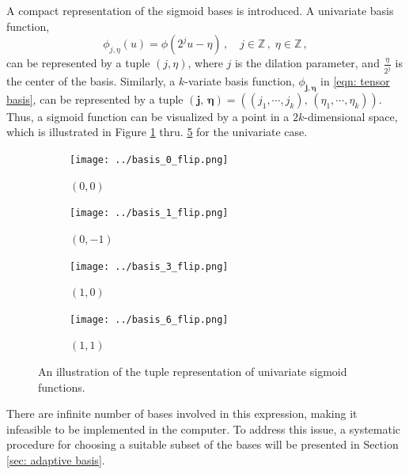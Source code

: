 A compact representation of the sigmoid bases is introduced.
A univariate basis function,
\begin{equation*}
    {\phi}_{j,\eta}(u) = {\phi}(2^j u-\eta) \,,\quad j\in \mathbb{Z} \,,\;\eta \in \mathbb{Z}\,,
    \label{eqn: self similar sigmoid}
\end{equation*}
can be represented by a tuple $(j, \eta)$,
where $j$ is the dilation parameter, and $\frac{\eta}{2^j}$ is
the center of the basis.
Similarly, a $k$-variate basis function, $\phi_{\boldsymbol{j}, \boldsymbol{\eta}}$ in
\eqref{eqn: tensor basis}, can be represented by a tuple $\left(\boldsymbol{j}, \,
\boldsymbol{\eta}\right) 
= \left((j_1,\cdots, j_k), \, \left(\eta_1, \cdots, \eta_k\right)\right)$.
Thus, a sigmoid function can be visualized by a point in a $2k$-dimensional space,
which is illustrated in Figure \ref{fig: basis 0} thru. \ref{fig: basis 3} 
for the univariate case.\\
\begin{figure}[htbp]\begin{center}
    \begin{subfigure}[t]{.48\textwidth}
        \centering
        \texttt{[image: ../basis\_0\_flip.png]}
        \caption{$\left(0,0\right)$}
        \label{fig: basis 0}
    \end{subfigure}
    \begin{subfigure}[t]{.48\textwidth}
        \centering
        \texttt{[image: ../basis\_1\_flip.png]}
        \caption{$\left(0, -1\right)$}
        \label{fig: basis 1}
    \end{subfigure}
    \begin{subfigure}[t]{.48\textwidth}
        \centering
        \texttt{[image: ../basis\_3\_flip.png]}
        \caption{$\left(1, 0\right)$}
        \label{fig: basis 2}
    \end{subfigure}
    \begin{subfigure}[t]{.48\textwidth}
        \centering
        \texttt{[image: ../basis\_6\_flip.png]}
        \caption{$\left(1, 1\right)$}
        \label{fig: basis 3}
    \end{subfigure}
    \caption{An illustration of the tuple representation of univariate sigmoid functions.}
\end{center}\end{figure}

There are infinite number of bases involved
in this expression, making it infeasible to be implemented in the computer. To address this issue,
a systematic procedure for choosing
a suitable subset of the bases %
will be presented in Section \ref{sec: adaptive basis}.\\


